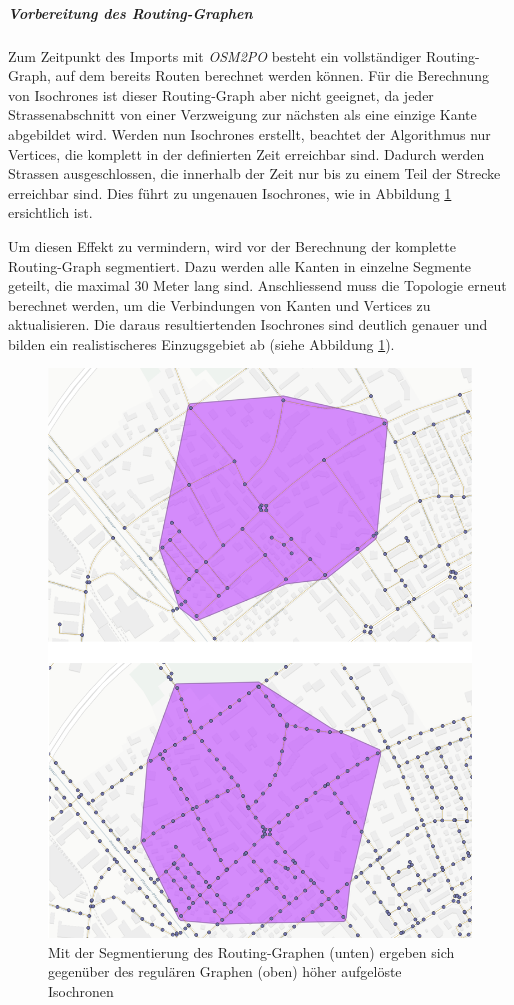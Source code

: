 \subparagraph{Vorbereitung des Routing-Graphen}
Zum Zeitpunkt des Imports mit \emph{OSM2PO} besteht ein vollständiger Routing-Graph, auf dem bereits Routen berechnet werden können.
Für die Berechnung von \glspl{Isochrone} ist dieser Routing-Graph aber nicht geeignet, da jeder Strassenabschnitt von einer Verzweigung zur nächsten als eine einzige Kante abgebildet wird.
Werden nun \glspl{Isochrone} erstellt, beachtet der Algorithmus nur Vertices, die komplett in der definierten Zeit erreichbar sind.
Dadurch werden Strassen ausgeschlossen, die innerhalb der Zeit nur bis zu einem Teil der Strecke erreichbar sind.
Dies führt zu ungenauen \glspl{Isochrone}, wie in Abbildung \ref{fig:vergleich_segmentierung} ersichtlich ist.

Um diesen Effekt zu vermindern, wird vor der Berechnung der komplette Routing-Graph segmentiert.
Dazu werden alle Kanten in einzelne Segmente geteilt, die maximal 30 Meter lang sind.
Anschliessend muss die Topologie erneut berechnet werden, um die Verbindungen von Kanten und Vertices zu aktualisieren.
Die daraus resultiertenden \glspl{Isochrone} sind deutlich genauer und bilden ein realistischeres Einzugsgebiet ab (siehe Abbildung \ref{fig:vergleich_segmentierung}).

\begin{figure}[ht]
    \centering
    \includegraphics[width=0.5\linewidth]{projectdoc/img/vergleich_segmentierung}
    \caption[Vergleich von Isochronen bei regulärem und segmentiertem Routing-Graph]{Mit der Segmentierung des Routing-Graphen (unten) ergeben sich gegenüber des regulären Graphen (oben) höher aufgelöste Isochronen}
    \label{fig:vergleich_segmentierung}
\end{figure}


